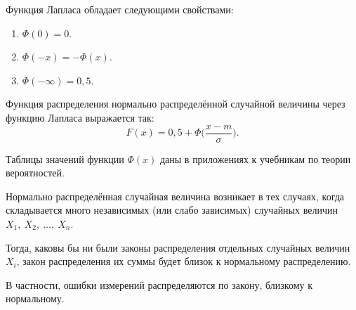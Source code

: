 \documentclass[a4paper]{article}
\begin{document}
                    Функция Лапласа обладает следующими свойствами:
                    \begin{enumerate}
                        \item $\Phi (0) = 0$.
                        \item $\Phi (-x) = -\Phi (x)$.
                        \item $\Phi (-\infty) = 0,5$.
                    \end{enumerate}

                    Функция распределения нормально распределённой случайной величины через функцию Лапласа выражается так:
                    \begin{equation*}
                        F(x) = 0,5 + \Phi \Big( \frac{x - m}{\sigma} \Big) .
                    \end{equation*}

                    Таблицы значений функции $\Phi (x)$ даны в приложениях к учебникам по теории вероятностей.

                    Нормально распределённая случайная величина возникает в тех случаях, когда складывается много независимых (или слабо зависимых) случайных величин $X_1 , \: X_2 , \: \ldots , \: X_n$.
                    
                    Тогда, каковы бы ни были законы распределения отдельных случайных величин $X_i$, закон распределения их суммы будет близок к нормальному распределению.
                    
                    В частности, ошибки измерений распределяются по закону, близкому к нормальному.
\end{document}
